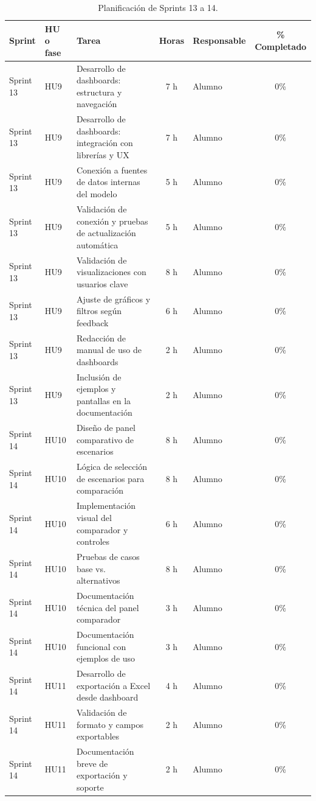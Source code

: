 \documentclass[
11pt, %
]{charter}
\begin{document}
\begin{table}[htpb]
\centering
\caption{Planificación de Sprints 13 a 14.}
\begin{tabularx}{\linewidth}{@{}|l|l|X|c|l|c|@{}}
\hline
\rowcolor[HTML]{C0C0C0}
Sprint & HU o fase & Tarea & Horas & Responsable & \% Completado \\ \hline
Sprint 13 & HU9 & Desarrollo de dashboards: estructura y navegación & 7 h & Alumno & 0\% \\ \hline
Sprint 13 & HU9 & Desarrollo de dashboards: integración con librerías y UX & 7 h & Alumno & 0\% \\ \hline
Sprint 13 & HU9 & Conexión a fuentes de datos internas del modelo & 5 h & Alumno & 0\% \\ \hline
Sprint 13 & HU9 & Validación de conexión y pruebas de actualización automática & 5 h & Alumno & 0\% \\ \hline
Sprint 13 & HU9 & Validación de visualizaciones con usuarios clave & 8 h & Alumno & 0\% \\ \hline
Sprint 13 & HU9 & Ajuste de gráficos y filtros según feedback & 6 h & Alumno & 0\% \\ \hline
Sprint 13 & HU9 & Redacción de manual de uso de dashboards & 2 h & Alumno & 0\% \\ \hline
Sprint 13 & HU9 & Inclusión de ejemplos y pantallas en la documentación & 2 h & Alumno & 0\% \\ \hline
\hline
Sprint 14 & HU10 & Diseño de panel comparativo de escenarios & 8 h & Alumno & 0\% \\ \hline
Sprint 14 & HU10 & Lógica de selección de escenarios para comparación & 8 h & Alumno & 0\% \\ \hline
Sprint 14 & HU10 & Implementación visual del comparador y controles & 6 h & Alumno & 0\% \\ \hline
Sprint 14 & HU10 & Pruebas de casos base vs. alternativos & 8 h & Alumno & 0\% \\ \hline
Sprint 14 & HU10 & Documentación técnica del panel comparador & 3 h & Alumno & 0\% \\ \hline
Sprint 14 & HU10 & Documentación funcional con ejemplos de uso & 3 h & Alumno & 0\% \\ \hline
Sprint 14 & HU11 & Desarrollo de exportación a Excel desde dashboard & 4 h & Alumno & 0\% \\ \hline
Sprint 14 & HU11 & Validación de formato y campos exportables & 2 h & Alumno & 0\% \\ \hline
Sprint 14 & HU11 & Documentación breve de exportación y soporte & 2 h & Alumno & 0\% \\ \hline
\end{tabularx}
\end{table}
\end{document}
